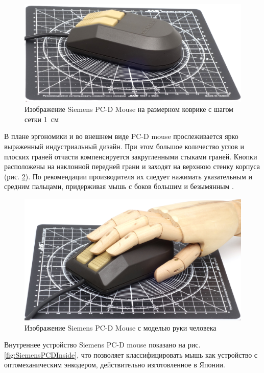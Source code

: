 \documentclass[11pt, a4paper]{article}
\begin{document}
\begin{figure}[h]
    \centering
    \includegraphics[scale=0.42]{1985_siemens_pcd_mouse/size_30.jpg}
    \caption{Изображение Siemens PC-D Mouse на размерном коврике с шагом сетки 1~см}
    \label{fig:SiemensPCDSize}
\end{figure}

В плане эргономики и во внешнем виде PC-D mouse прослеживается ярко выраженный индустриальный дизайн. При этом большое количество углов и плоских граней отчасти компенсируется закругленными стыками граней. Кнопки расположены на наклонной передней грани и заходят на верхнюю стенку корпуса (рис. \ref{fig:SiemensPCDHand}). По рекомендации производителя их следует нажимать указательным и средним пальцами, придерживая мышь с боков большим и безымянным \cite{manual}.

\begin{figure}[h]
    \centering
    \includegraphics[scale=0.42]{1985_siemens_pcd_mouse/hand_30.jpg}
    \caption{Изображение Siemens PC-D Mouse с моделью руки человека}
    \label{fig:SiemensPCDHand}
\end{figure}

Внутреннее устройство Siemens PC-D mouse показано на рис. \ref{fig:SiemensPCDInside}, что позволяет классифицировать мышь как устройство с оптомеханическим энкодером, действительно изготовленное в Японии.
\end{document}
